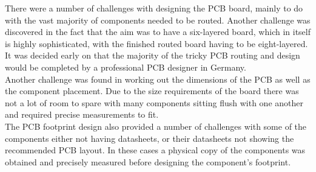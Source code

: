 	There were a number of challenges with designing the PCB board, mainly to do with the vast majority of components needed to be routed. 
Another challenge was discovered in the fact that the aim was to have a six-layered board, which in itself is highly sophisticated, with the finished routed board having to be eight-layered.
It was decided early on that the majority of the tricky PCB routing and design would be completed by a professional PCB designer in Germany.\\
Another challenge was found in working out the dimensions of the PCB as well as the component placement. 
Due to the size requirements of the board there was not a lot of room to spare with many components sitting flush with one another and required precise measurements to fit. \\
The PCB footprint design also provided a number of challenges with some of the components either not having datasheets, or their datasheets not showing the recommended PCB layout. 
In these cases a physical copy of the components was obtained and precisely measured before designing the component's footprint.






